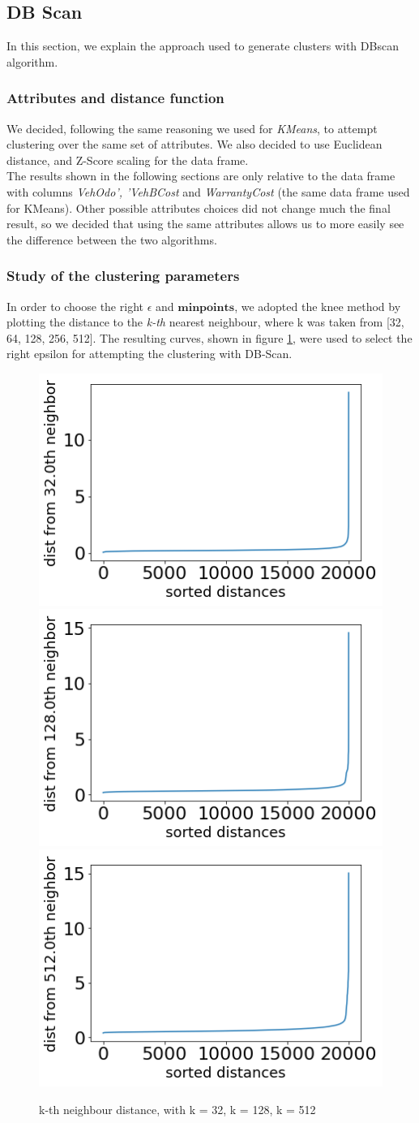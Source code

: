 \documentclass{article}
\begin{document}
	
	
	
	\subsection{DB Scan}
	In this section, we explain the approach used to generate clusters with DBscan algorithm.
	
	\subsubsection{Attributes and distance function}
	
	We decided, following the same reasoning we used for \emph{KMeans}, to attempt clustering over the same set of attributes. We also decided to use Euclidean distance, and Z-Score scaling for the data frame.\\
	The results shown in the following sections are only relative to the data frame with columns \emph{VehOdo', 'VehBCost} and \emph{WarrantyCost} (the same data frame used for KMeans). Other possible attributes choices did not change much the final result, so we decided that using the same attributes allows us to more easily see the difference between the two algorithms.
	
	\subsubsection{Study of the clustering parameters}
	In order to choose the right $\epsilon$ and $\mathbf{min points}$, we adopted the knee method by plotting the distance to the \emph{k-th} nearest neighbour, where k was taken from [32, 64, 128, 256, 512]. The resulting curves, shown in figure \ref{fig:kth}, were used to select the right epsilon for attempting the clustering with DB-Scan. 
	
	\begin{figure}[]
		\centering
		\includegraphics[width=.32\textwidth]{a32}\hfill
		\includegraphics[width=.32\textwidth]{a128}\hfill
		\includegraphics[width=.32\textwidth]{a512}
		\caption{k-th neighbour distance, with k = 32, k = 128, k = 512}
		\label{fig:kth}
	\end{figure}
	
\end{document}
